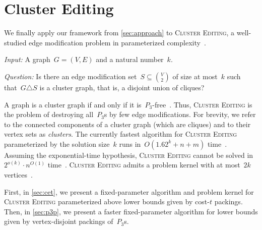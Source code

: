 \documentclass[envcountsame,numbook,smallextended]{svjour3}
\numberwithin{equation}{section}
\numberwithin{figure}{section}
\newcommand{\decprob}[3]{\pagebreak[3]
  \begin{problem}[\boldmath#1]
    \begin{compactdesc}
        \item[\normalfont\it Input:] #2
        \item[\normalfont\it Question:] #3
    \end{compactdesc}
  \end{problem}
}
\newcommand{\symdiff}{\triangle}
\begin{document}
\section{Cluster Editing}
\label{sec:cluster-edit}
We finally apply our framework from \cref{sec:approach} to \textsc{Cluster Editing}, a well-studied edge modification problem in parameterized complexity~\cite{Boeck12,CM12,FKP+11,KU12}. \decprob{\textsc{Cluster Editing}}{A graph~$G=(V,E)$ and a natural number~$k$.}  {Is there an edge modification set~$S\subseteq \binom{V}{2}$ of size at most~$k$ such that~$G\symdiff{} S$ is a cluster graph, that is, a disjoint union of cliques?}  A graph is a cluster graph if and only if it is~$P_3$-free~\cite{SST04}. Thus, \textsc{Cluster Editing} is the problem of destroying all~$P_3$s by few edge modifications. For brevity, we refer to the connected components of a cluster graph (which are cliques) and to their vertex sets as \emph{clusters}. The currently fastest algorithm for
\textsc{Cluster Editing} parameterized by the solution size~$k$ runs in~$O(1.62^k + n+m)$ time~\cite{Boeck12}.
Assuming the
exponential-time hypothesis, \textsc{Cluster Editing} cannot be solved
in~$2^{o(k)}\cdot n^{O(1)}$ time~\cite{FKP+11,KU12}. \textsc{Cluster
  Editing} admits a problem kernel with at most~$2k$
vertices~\cite{CM12}.

First, in \cref{sec:cet}, we present a fixed-parameter algorithm and problem kernel for \textsc{Cluster Editing} parameterized above lower bounds given by cost-\(t\) packings.  Then, in \cref{sec:p3p}, we present a faster fixed-parameter algorithm for lower bounds given by vertex-disjoint packings of~\(P_3\)s.
\end{document}
